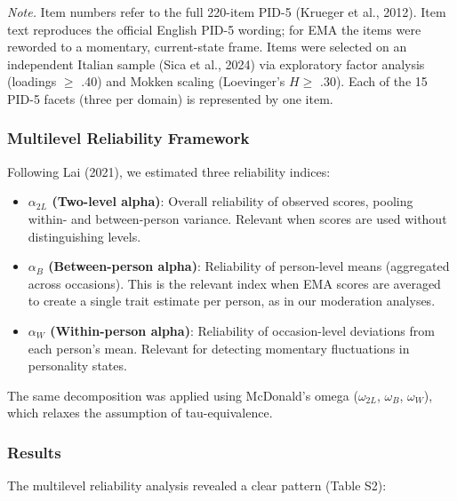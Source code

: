 \documentclass[
  english,
  man,floatsintext]{apa6}
\begin{document}
\emph{Note.} Item numbers refer to the full 220-item PID-5 (Krueger et al., 2012). Item text reproduces the official English PID-5 wording; for EMA the items were reworded to a momentary, current-state frame. Items were selected on an independent Italian sample (Sica et al., 2024) via exploratory factor analysis (loadings \(\geq\) .40) and Mokken scaling (Loevinger's \(H \geq\) .30). Each of the 15 PID-5 facets (three per domain) is represented by one item.

\subsubsection{Multilevel Reliability Framework}\label{multilevel-reliability-framework}

Following Lai (2021), we estimated three reliability indices:

\begin{itemize}
\item
  \textbf{\(\alpha_{2L}\) (Two-level alpha)}: Overall reliability of observed scores, pooling within- and between-person variance. Relevant when scores are used without distinguishing levels.
\item
  \textbf{\(\alpha_B\) (Between-person alpha)}: Reliability of person-level means (aggregated across occasions). This is the relevant index when EMA scores are averaged to create a single trait estimate per person, as in our moderation analyses.
\item
  \textbf{\(\alpha_W\) (Within-person alpha)}: Reliability of occasion-level deviations from each person's mean. Relevant for detecting momentary fluctuations in personality states.
\end{itemize}

The same decomposition was applied using McDonald's omega (\(\omega_{2L}\), \(\omega_B\), \(\omega_W\)), which relaxes the assumption of tau-equivalence.

\subsubsection{Results}\label{results-1}

The multilevel reliability analysis revealed a clear pattern (Table S2):
\end{document}
